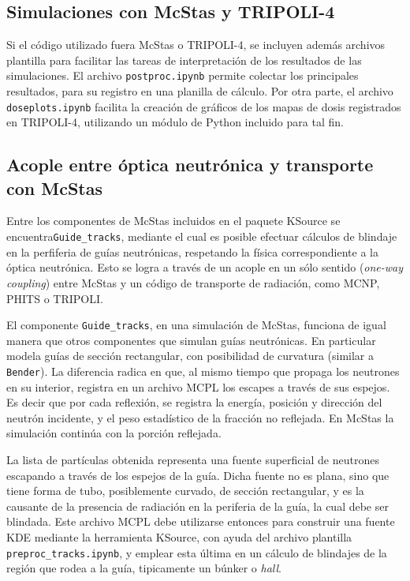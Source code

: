 \subsection{Simulaciones con McStas y TRIPOLI-4}

Si el código utilizado fuera McStas o TRIPOLI-4, se incluyen además archivos plantilla para facilitar las tareas de interpretación de los resultados de las simulaciones. El archivo \verb|postproc.ipynb| permite colectar los principales resultados, para su registro en una planilla de cálculo. Por otra parte, el archivo \verb|doseplots.ipynb| facilita la creación de gráficos de los mapas de dosis registrados en TRIPOLI-4, utilizando un módulo de Python incluido para tal fin.


\subsection{Acople entre óptica neutrónica y transporte con McStas}

Entre los componentes de McStas incluidos en el paquete KSource se encuentra\linebreak \verb|Guide_tracks|, mediante el cual es posible efectuar cálculos de blindaje en la perfiferia de guías neutrónicas, respetando la física correspondiente a la óptica neutrónica. Esto se logra a través de un acople en un sólo sentido (\emph{one-way coupling}) entre McStas y un código de transporte de radiación, como MCNP, PHITS o TRIPOLI.

El componente \verb|Guide_tracks|, en una simulación de McStas, funciona de igual manera que otros componentes que simulan guías neutrónicas. En particular modela guías de sección rectangular, con posibilidad de curvatura (similar a \verb|Bender|). La diferencia radica en que, al mismo tiempo que propaga los neutrones en su interior, registra en un archivo MCPL los escapes a través de sus espejos. Es decir que por cada reflexión, se registra la energía, posición y dirección del neutrón incidente, y el peso estadístico de la fracción no reflejada. En McStas la simulación continúa con la porción reflejada.

La lista de partículas obtenida representa una fuente superficial de neutrones escapando a través de los espejos de la guía. Dicha fuente no es plana, sino que tiene forma de tubo, posiblemente curvado, de sección rectangular, y es la causante de la presencia de radiación en la periferia de la guía, la cual debe ser blindada. Este archivo MCPL debe utilizarse entonces para construir una fuente KDE mediante la herramienta KSource, con ayuda del archivo plantilla \verb|preproc_tracks.ipynb|, y emplear esta última en un cálculo de blindajes de la región que rodea a la guía, tipicamente un búnker o \emph{hall}.


